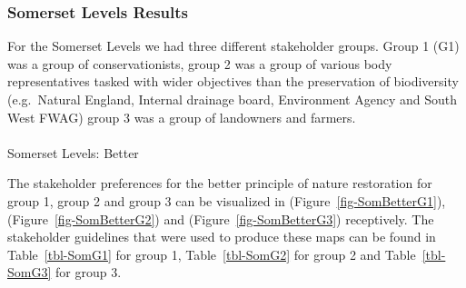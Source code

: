 \documentclass[
  12pt,
  letterpaper,
  DIV=11,
  numbers=noendperiod]{scrartcl}
\makeatletter
\let\oldparagraph\paragraph
\renewcommand{\paragraph}{
    \@ifstar
      \xxxParagraphStar
      \xxxParagraphNoStar
  }
\newcommand{\xxxParagraphStar}[1]{\oldparagraph*{#1}\mbox{}}
\newcommand{\xxxParagraphNoStar}[1]{\oldparagraph{#1}\mbox{}}
\makeatother
\begin{document}
\newpage{}

\subsubsection{Somerset Levels Results}\label{somerset-levels-results}

For the Somerset Levels we had three different stakeholder groups. Group
1 (G1) was a group of conservationists, group 2 was a group of various
body representatives tasked with wider objectives than the preservation
of biodiversity (e.g.~Natural England, Internal drainage board,
Environment Agency and South West FWAG) group 3 was a group of
landowners and farmers.

\paragraph{Somerset Levels: Better}\label{somerset-levels-better}

The stakeholder preferences for the better principle of nature
restoration for group 1, group 2 and group 3 can be visualized in
(Figure~\ref{fig-SomBetterG1}), (Figure~\ref{fig-SomBetterG2}) and
(Figure~\ref{fig-SomBetterG3}) receptively. The stakeholder guidelines
that were used to produce these maps can be found in
Table~\ref{tbl-SomG1} for group 1, Table~\ref{tbl-SomG2} for group 2 and
Table~\ref{tbl-SomG3} for group 3.
\end{document}
